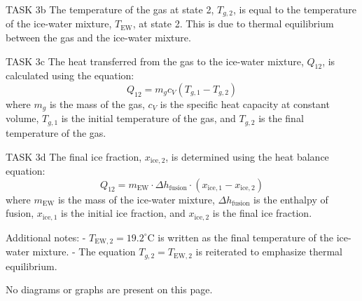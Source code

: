 TASK 3b  
The temperature of the gas at state 2, \( T_{g,2} \), is equal to the temperature of the ice-water mixture, \( T_{\text{EW}} \), at state 2. This is due to thermal equilibrium between the gas and the ice-water mixture.  

TASK 3c  
The heat transferred from the gas to the ice-water mixture, \( Q_{12} \), is calculated using the equation:  
\[
Q_{12} = m_g c_V (T_{g,1} - T_{g,2})
\]  
where \( m_g \) is the mass of the gas, \( c_V \) is the specific heat capacity at constant volume, \( T_{g,1} \) is the initial temperature of the gas, and \( T_{g,2} \) is the final temperature of the gas.  

TASK 3d  
The final ice fraction, \( x_{\text{ice},2} \), is determined using the heat balance equation:  
\[
Q_{12} = m_{\text{EW}} \cdot \Delta h_{\text{fusion}} \cdot (x_{\text{ice},1} - x_{\text{ice},2})
\]  
where \( m_{\text{EW}} \) is the mass of the ice-water mixture, \( \Delta h_{\text{fusion}} \) is the enthalpy of fusion, \( x_{\text{ice},1} \) is the initial ice fraction, and \( x_{\text{ice},2} \) is the final ice fraction.  

Additional notes:  
- \( T_{\text{EW},2} = 19.2^\circ\text{C} \) is written as the final temperature of the ice-water mixture.  
- The equation \( T_{g,2} = T_{\text{EW},2} \) is reiterated to emphasize thermal equilibrium.  

No diagrams or graphs are present on this page.